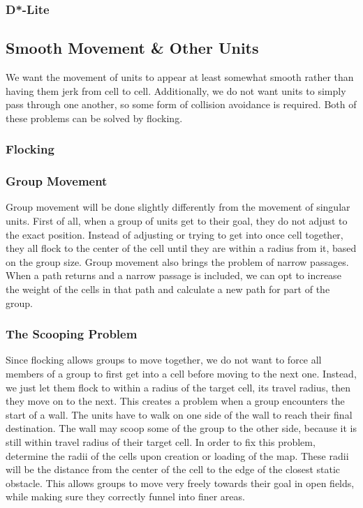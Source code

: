 \subsubsection{D*-Lite}

\subsection{Smooth Movement \& Other Units}
We want the movement of units to appear at least somewhat smooth rather than having them jerk from cell to cell. Additionally, we do not want units to simply pass through one another, so some form of collision avoidance is required. Both of these problems can be solved by flocking.

\subsubsection{Flocking}

\subsubsection{Group Movement}
Group movement will be done slightly differently from the movement of singular units. First of all, when a group of units get to their goal, they do not adjust to the exact position. Instead of adjusting or trying to get into once cell together, they all flock to the center of the cell until they are within a radius from it, based on the group size. Group movement also brings the problem of narrow passages. When a path returns and a narrow passage is included, we can opt to increase the weight of the cells in that path and calculate a new path for part of the group.

\subsubsection{The Scooping Problem}
Since flocking allows groups to move together, we do not want to force all members of a group to first get into a cell before moving to the next one. Instead, we just let them flock to within a radius of the target cell, its travel radius, then they move on to the next. This creates a problem when a group encounters the start of a wall. The units have to walk on one side of the wall to reach their final destination. The wall may scoop some of the group to the other side, because it is still within travel radius of their target cell.\newline
In order to fix this problem, determine the radii of the cells upon creation or loading of the map. These radii will be the distance from the center of the cell to the edge of the closest static obstacle. This allows groups to move very freely towards their goal in open fields, while making sure they correctly funnel into finer areas.

